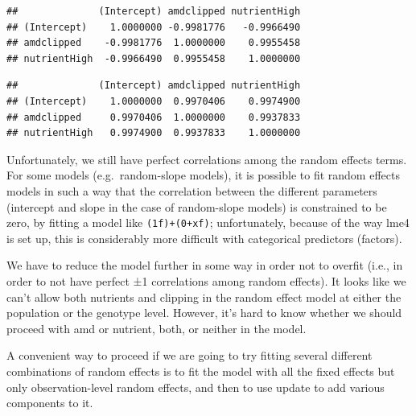 \documentclass[
  12pt,
]{book}
\newenvironment{Shaded}{\begin{snugshade}}{\end{snugshade}}
\newcommand{\KeywordTok}[1]{\textcolor[rgb]{0.13,0.29,0.53}{\textbf{#1}}}
\newcommand{\NormalTok}[1]{#1}
\newcommand{\OperatorTok}[1]{\textcolor[rgb]{0.81,0.36,0.00}{\textbf{#1}}}
\newcommand{\StringTok}[1]{\textcolor[rgb]{0.31,0.60,0.02}{#1}}
\begin{document}
\begin{Shaded}
\end{Shaded}

\begin{verbatim}
##              (Intercept) amdclipped nutrientHigh
## (Intercept)    1.0000000 -0.9981776   -0.9966490
## amdclipped    -0.9981776  1.0000000    0.9955458
## nutrientHigh  -0.9966490  0.9955458    1.0000000
\end{verbatim}

\begin{Shaded}
\end{Shaded}

\begin{verbatim}
##              (Intercept) amdclipped nutrientHigh
## (Intercept)    1.0000000  0.9970406    0.9974900
## amdclipped     0.9970406  1.0000000    0.9937833
## nutrientHigh   0.9974900  0.9937833    1.0000000
\end{verbatim}

Unfortunately, we still have perfect correlations among the random effects terms. For some models (e.g.~random-slope models), it is possible to fit random effects models in such a way that the correlation between the different parameters (intercept and slope in the case of random-slope models) is constrained to be zero, by fitting a model like \texttt{(1\textbar{}f)+(0+x\textbar{}f)}; unfortunately, because of the way lme4 is set up, this is considerably more difficult with categorical predictors (factors).

We have to reduce the model further in some way in order not to overfit (i.e., in order to not have perfect ±1 correlations among random effects). It looks like we can't allow both nutrients and clipping in the random effect model at either the population or the genotype level. However, it's hard to know whether we should proceed with amd or nutrient, both, or neither in the model.

A convenient way to proceed if we are going to try fitting several different combinations of random effects is to fit the model with all the fixed effects but only observation-level random effects, and then to use update to add various components to it.
\end{document}
